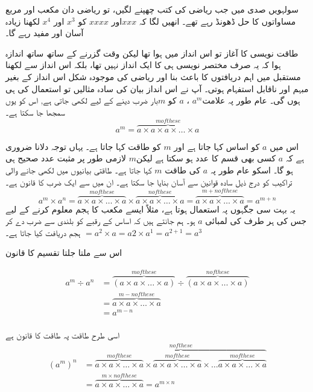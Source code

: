 سولہویں صدی میں جب ریاضی کی کتب چھپنے لگیں، تو ریاضی دان مکعب اور مربع مساواتوں کا حل ڈھونڈ رہے تھے۔ انھیں لگا کہ \(xxx\)اور \(xxxx\) کو \(x^{3}\) اور 
\(x^{4}\) لکھنا زیادہ آسان اور مفید رہے گا۔

طاقت نویسی کا آغاز تو اس انداز میں ہوا تھا لیکن وقت گزرنے کے ساتھ ساتھ اندازہ ہوا کہ یہ صرف مختصر نویسی ہی کا ایک انداز نہیں تھا، بلکہ اس انداز سے لکھنا مستقبل میں اہم دریافتوں کا باعث بنا اور ریاضی کی موجودہ شکل اس انداز کے بغیر مبہم اور ناقابل استفہام ہوتی۔
آپ نے اس انداز بیان کی سادہ مثالیں تو استعمال کی ہی ہوں گی۔ عام طور پہ علامت\(a^{m}\) ، \(a\) کو \(m\)بار ضرب دینے کے لیے لکھی جاتی ہے, اس کو یوں سمجھا جا سکتا ہے۔
\[a^{m}=\overbrace{a\times a\times a\times\dotsc\times a}^{m of these}\]

اس میں \(a\) کو اساس کہا جاتا ہے اور \(m\) کو طاقت کہا جاتا ہے۔ یہاں توجہ دلانا ضروری ہے کہ \(a\) کسی بھی قسم کا عدد ہو سکتا ہے لیکن\(m\) لازمی طور پر مثبت عدد صحیح ہی ہو گا۔ اسکو عام طور پہ \(a\) کی طاقت \(m\) کہا جاتا ہے۔ طاقتی بیانیوں میں لکھی جانے والی تراکیب کو درج ذیل سادہ قوانین سے آسان بنایا جا سکتا ہے۔
ان میں سے ایک ضرب کا قانون ہے۔
\[a^{m}\times a^{n}=\overbrace{a\times a\times\dotsc\times a}^{m of these}\times\overbrace{a\times a\times\dotsc\times a}^{n of these}=\overbrace{a\times a\times\dotsc\times a}^{m+n of these}=a^{m+n}\]
یہ بہت سی جگہوں پہ استعمال ہوتا ہے، مثلاً ایسے مکعب کا ہجم معلوم کرنے کے لیے جس کی ہر طرف کی لمبائی $a$
 ہو۔ ہم جانتے ہیں کہ اساس کے رقبے کو بلندی سے ضرب دے کر ہجم دریافت کیا جاتا ہے۔
\(=a^{2}\times a=a{2}\times a^{1}=a^{2+1}=a^{3}\)

اس سے ملتا جلتا تقسیم کا قانون

\begin{align*}
a^{m}\div a^{n}&=\overbrace{(a\times a\times\dotsc\times a)}^{m of these}\div\overbrace{(a\times a\times\dotsc\times a)}^{n of these}\\
&=\overbrace{a\times a\times\dotsc\times a}^{m-n of these}\\
&=a^{m-n}\\
\end{align*}

 اسی طرح طاقت پہ طاقت کا قانون ہے
\begin{align*}
(a^{m})^{n}&=\overbrace{\overbrace{a\times a\times\dotsc\times a}^{m of these}\times \overbrace{a\times a\times\dotsc\times a}^{m of these}\times\dotsc\overbrace{a\times a\times\dotsc\times a}^{m of these}}^{n of these}\\
&=\overbrace{a\times a\times\dotsc\times a}^{m\times n of these}=a^{m\times n}\\
\end{align*}

